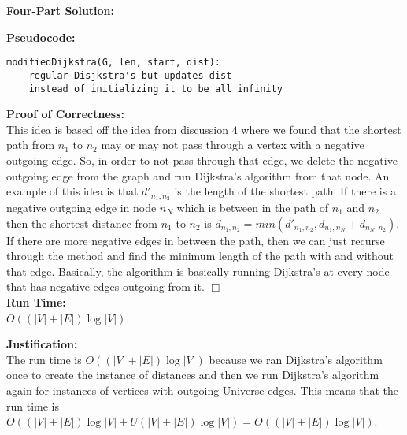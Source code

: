 \documentclass[11pt]{article}
\def\endproofmark{$\Box$}
\newenvironment{FourPartSolution}{\par{\bf Four-Part Solution:}}{\smallskip}
\newenvironment{pseudocode}{\par{\bf Pseudocode:}}{\smallskip}
\newenvironment{proofOfCorrectness}{\par{\bf Proof of Correctness:}}{\endproofmark\smallskip}
\newenvironment{runTime}{{\bf Run Time:}}{\smallskip}
\newenvironment{justification}{\par{\bf Justification:}}{\smallskip}
\begin{document}
\begin{FourPartSolution}
\begin{pseudocode}
\begin{lstlisting}
modifiedDijkstra(G, len, start, dist):
	regular Disjkstra's but updates dist 
	instead of initializing it to be all infinity
\end{lstlisting}
\end{pseudocode}
\begin{proofOfCorrectness}
\\
This idea is based off the idea from discussion $4$ where we found that the shortest path from $n_1$ to $n_2$ may or may not pass through a vertex with a negative outgoing edge. So, in order to not pass through that edge, we delete the negative outgoing edge from the graph and run Dijkstra's algorithm from that node. An example of this idea is that $d'_{n_1, n_2}$ is the length of the shortest path. If there is a negative outgoing edge in node $n_N$ which is between in the path of $n_1$ and $n_2$ then the shortest distance from $n_1$ to $n_2$ is $d_{n_1, n_2} = min(d'_{n_1, n_2}, d_{n_1, n_N} + d_{n_N, n_2})$. If there are more negative edges in between the path, then we can just recurse through the method and find the minimum length of the path with and without that edge. Basically, the algorithm is basically running Dijkstra’s at every node that has negative edges outgoing from it.
\end{proofOfCorrectness}
\\
\begin{runTime}
\\
$O((|V| + |E|)\log{|V|})$.
\end{runTime}
\\
\begin{justification}
\\
The run time is $O((|V| + |E|)\log{|V|})$ because we ran Dijkstra's algorithm once to create the instance of distances and then we run Dijkstra's algorithm again for instances of vertices with outgoing Universe edges. This means that the run time is $O((|V| + |E|)\log{|V|} + U(|V| + |E|)\log{|V|}) = O((|V| + |E|)\log{|V|})$.
\end{justification}
\end{FourPartSolution}
\end{document}
